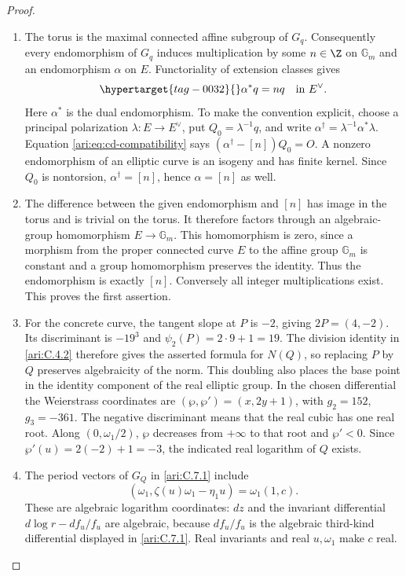 \begin{proof}
\begin{enumerate}[label=\arabic*.,leftmargin=*]
\item The torus is the maximal connected affine subgroup of $G_q$.
Consequently every endomorphism of $G_q$ induces multiplication
by some $n\in\Z$ on $\mathbb G_m$ and an endomorphism
$\alpha$ on $E$. Functoriality of extension classes gives
\begin{equation}\hypertarget{tag-0032}{}\label{ari:eq:cd-compatibility}
 \alpha^*q=nq\quad\text{in }E^\vee.
\end{equation}
Here $\alpha^*$ is the dual endomorphism. To make the
convention explicit, choose a principal polarization
$\lambda:E\to E^\vee$, put $Q_0=\lambda^{-1}q$, and
write $\alpha^\dagger=\lambda^{-1}\alpha^*\lambda$.
Equation \eqref{ari:eq:cd-compatibility} says
$(\alpha^\dagger-[n])Q_0=O$. A nonzero endomorphism of an
elliptic curve is an isogeny and has finite kernel. Since
$Q_0$ is nontorsion, $\alpha^\dagger=[n]$, hence
$\alpha=[n]$ as well.

\item The difference between the given endomorphism and $[n]$ has
image in the torus and is trivial on the torus. It therefore
factors through an algebraic-group homomorphism
$E\to\mathbb G_m$. This homomorphism is zero, since a
morphism from the proper connected curve $E$ to the affine
group $\mathbb G_m$ is constant and a group homomorphism
preserves the identity. Thus the endomorphism is exactly $[n]$. Conversely all integer
multiplications exist. This proves the first assertion.

\item For the concrete curve, the tangent slope at $P$ is $-2$,
giving $2P=(4,-2)$. Its discriminant is $-19^3$ and
$\psi_2(P)=2\cdot9+1=19$. The division identity in \cref{ari:C.4.2}
therefore gives the asserted formula for $N(Q)$, so replacing
$P$ by $Q$ preserves algebraicity of the norm. This doubling
also places the base point in the identity component of the
real elliptic group. In the
chosen differential the Weierstrass coordinates are
$(\wp,\wp')=(x,2y+1)$, with $g_2=152$, $g_3=-361$.
The negative discriminant means that the real cubic has one
real root. Along $(0,\omega_1/2)$, $\wp$ decreases from
$+\infty$ to that root and $\wp'<0$. Since
$\wp'(u)=2(-2)+1=-3$, the indicated real logarithm of $Q$
exists.

\item The period vectors of $G_Q$ in \ref{ari:C.7.1} include
\[
 (\omega_1,\zeta(u)\omega_1-\eta_1u)
       =\omega_1(1,c).
\]
These are algebraic logarithm coordinates: $dz$ and the
invariant differential $d\log r-df_u/f_u$ are algebraic,
because $df_u/f_u$ is the algebraic third-kind differential
displayed in \ref{ari:C.7.1}. Real invariants and real $u,\omega_1$
make $c$ real.


\end{enumerate}
\end{proof}
